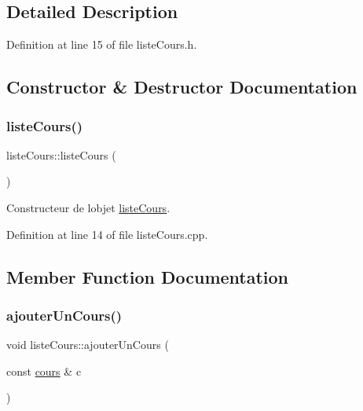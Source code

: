 \subsection{Detailed Description}


Definition at line 15 of file liste\+Cours.\+h.



\subsection{Constructor \& Destructor Documentation}
\hypertarget{classliste_cours_af5a10a6e898373e43355b8a29dc20b83}{}\label{classliste_cours_af5a10a6e898373e43355b8a29dc20b83} 
\subsubsection{\texorpdfstring{liste\+Cours()}{listeCours()}}
{\footnotesize\ttfamily liste\+Cours\+::liste\+Cours (\begin{DoxyParamCaption}{ }\end{DoxyParamCaption})}



Constructeur de l\textquotesingle{}objet \hyperlink{classliste_cours}{liste\+Cours}. 



Definition at line 14 of file liste\+Cours.\+cpp.



\subsection{Member Function Documentation}
\hypertarget{classliste_cours_aacc38305cfea76d8cc77d710d144ce8b}{}\label{classliste_cours_aacc38305cfea76d8cc77d710d144ce8b} 
\subsubsection{\texorpdfstring{ajouter\+Un\+Cours()}{ajouterUnCours()}}
{\footnotesize\ttfamily void liste\+Cours\+::ajouter\+Un\+Cours (\begin{DoxyParamCaption}\item[{const \hyperlink{classcours}{cours} \&}]{c }\end{DoxyParamCaption})}



